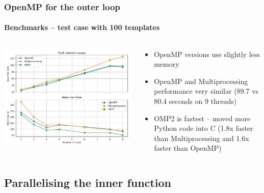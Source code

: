 \documentclass[aspectratio=169]{beamer}
\begin{document}
\begin{frame}[t]
    \frametitle{OpenMP for the outer loop}
    \framesubtitle{Benchmarks -- test case with 100 templates}
    
    \small
    
    \begin{columns}
        \begin{column}{0.6\textwidth}
            \includegraphics[width=\textwidth]{images/openmp-vs-multiprocessing-2-cropped.png}
        \end{column}
        \begin{column}{0.4\textwidth}
            \begin{itemize}
              \item OpenMP versions use slightly less memory
              \item OpenMP and Multiprocessing performance very similar (89.7 vs 80.4 seconds on 9 threads)
              \item OMP2 is fastest -- moved more Python code into C (1.8x faster than Multiprocessing and 1.6x faster than OpenMP)
            \end{itemize}
        \end{column}
    \end{columns}

\end{frame}




\subsection{Parallelising the inner function}
\end{document}
